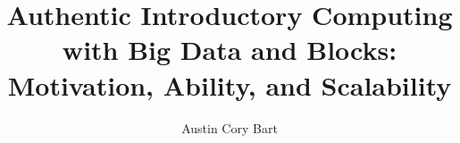 \documentclass[onecolumn,12pt]{article}
\begin{document}
    
\title{Authentic Introductory Computing with Big Data and Blocks: Motivation, Ability, and Scalability} 

\author{Austin Cory Bart}
\maketitle     

\newpage
\tableofcontents
\listoffigures
\listoftables

\newpage   

    
\newpage
{}
\setcounter{page}{1}
        
    
    
    
    
    
    
    
    
    
		
    
\newpage
		
		
\newpage
\setcounter{page}{1}

    
    
    
        
\end{document}
